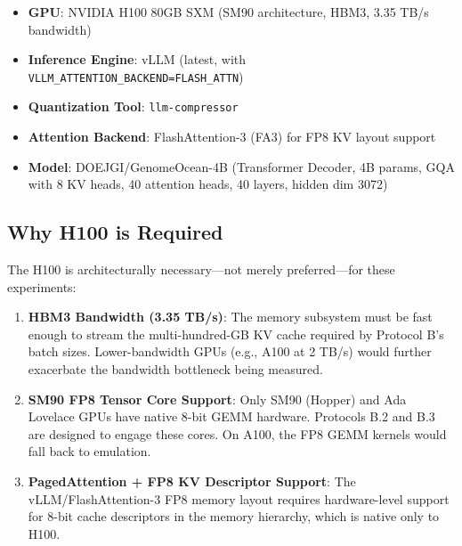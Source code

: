 \documentclass[12pt]{article}
\begin{document}
\begin{itemize}
    \item \textbf{GPU}: NVIDIA H100 80GB SXM (SM90 architecture, HBM3, 3.35 TB/s bandwidth)
    \item \textbf{Inference Engine}: vLLM (latest, with \texttt{VLLM\_ATTENTION\_BACKEND=FLASH\_ATTN})
    \item \textbf{Quantization Tool}: \texttt{llm-compressor}
    \item \textbf{Attention Backend}: FlashAttention-3 (FA3) for FP8 KV layout support
    \item \textbf{Model}: DOEJGI/GenomeOcean-4B (Transformer Decoder, 4B params, GQA with 8 KV heads, 40 attention heads, 40 layers, hidden dim 3072)
\end{itemize}

\subsection{Why H100 is Required}

The H100 is architecturally necessary---not merely preferred---for these experiments:
\begin{enumerate}
    \item \textbf{HBM3 Bandwidth (3.35 TB/s)}: The memory subsystem must be fast enough to stream the multi-hundred-GB KV cache required by Protocol B's batch sizes. Lower-bandwidth GPUs (e.g., A100 at 2 TB/s) would further exacerbate the bandwidth bottleneck being measured.
    \item \textbf{SM90 FP8 Tensor Core Support}: Only SM90 (Hopper) and Ada Lovelace GPUs have native 8-bit GEMM hardware. Protocols B.2 and B.3 are designed to engage these cores. On A100, the FP8 GEMM kernels would fall back to emulation.
    \item \textbf{PagedAttention + FP8 KV Descriptor Support}: The vLLM/FlashAttention-3 FP8 memory layout requires hardware-level support for 8-bit cache descriptors in the memory hierarchy, which is native only to H100.
\end{enumerate}
\end{document}
